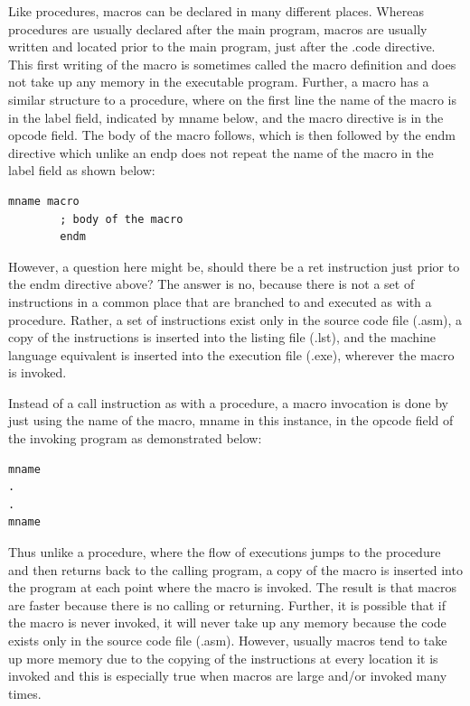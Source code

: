 \documentclass[10pt]{book}
\begin{document}
Like procedures, macros can be declared in many different places. Whereas procedures are usually declared after the main program, macros are usually written and located prior to the main program, just after the .code directive. This first writing of the macro is sometimes called the macro definition and does not take up any memory in the executable program. Further, a macro has a similar structure to a procedure, where on the first line the name of the macro is in the label field, indicated by mname below, and the macro directive is in the opcode field. The body of the macro follows, which is then followed by the endm directive which unlike an endp does not repeat the name of the macro in the label field as shown below:

\begin{verbatim}
mname macro
        ; body of the macro
        endm
\end{verbatim}

However, a question here might be, should there be a ret instruction just prior to the endm directive above? The answer is no, because there is not a set of instructions in a common place that are branched to and executed as with a procedure. Rather, a set of instructions exist only in the source code file (.asm), a copy of the instructions is inserted into the listing file (.lst), and the machine language equivalent is inserted into the execution file (.exe), wherever the macro is invoked.

Instead of a call instruction as with a procedure, a macro invocation is done by just using the name of the macro, mname in this instance, in the opcode field of the invoking program as demonstrated below:
\begin{verbatim}
mname
.
.
mname
\end{verbatim}

Thus unlike a procedure, where the flow of executions jumps to the procedure and then returns back to the calling program, a copy of the macro is inserted into the program at each point where the macro is invoked. The result is that macros are faster because there is no calling or returning. Further, it is possible that if the macro is never invoked, it will never take up any memory because the code exists only in the source code file (.asm). However, usually macros tend to take up more memory due to the copying of the instructions at every location it is invoked and this is especially true when macros are large and/or invoked many times.
\end{document}

